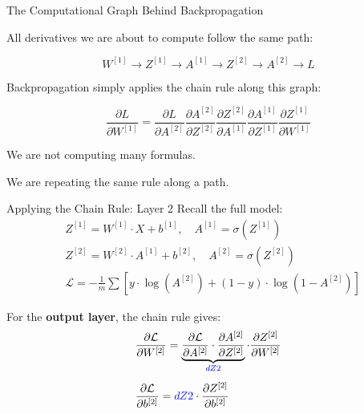 \documentclass[aspectratio=169]{beamer}
\begin{document}
\begin{frame}{The Computational Graph Behind Backpropagation}

All derivatives we are about to compute follow the same path:

\[
W^{[1]} \rightarrow Z^{[1]} \rightarrow A^{[1]} \rightarrow Z^{[2]} \rightarrow A^{[2]} \rightarrow L
\]

Backpropagation simply applies the chain rule along this graph:

\[
\frac{\partial L}{\partial W^{[1]}}
=
\frac{\partial L}{\partial A^{[2]}}
\frac{\partial A^{[2]}}{\partial Z^{[2]}}
\frac{\partial Z^{[2]}}{\partial A^{[1]}}
\frac{\partial A^{[1]}}{\partial Z^{[1]}}
\frac{\partial Z^{[1]}}{\partial W^{[1]}}
\]

We are not computing many formulas.

We are repeating the same rule along a path.
\end{frame}
%
%
%
%
\begin{frame}{Applying the Chain Rule: Layer 2}
Recall the full model:
\begin{align*}
&Z^{[1]} = W^{[1]} \cdot X + b^{[1]}, \quad A^{[1]} = \sigma(Z^{[1]})\\
&Z^{[2]} = W^{[2]} \cdot A^{[1]} + b^{[2]}, \quad A^{[2]} = \sigma(Z^{[2]})\\
&\mathcal{L} = -\frac{1}{m} \sum \left[ y \cdot \log(A^{[2]}) + (1 - y) \cdot \log(1 - A^{[2]}) \right]
\end{align*}

For the \textbf{output layer}, the chain rule gives:
\begin{align*}
&\frac{\partial \mathcal{L}}{\partial W^{[2]}} = \underbrace{\frac{\partial \mathcal{L}}{\partial A^{[2]}} \cdot \frac{\partial A^{[2]}}{\partial Z^{[2]}}}_{\textcolor{blue}{dZ2}} \cdot \frac{\partial Z^{[2]}}{\partial W^{[2]}}
\\[0.5em]
&\frac{\partial \mathcal{L}}{\partial b^{[2]}} = \textcolor{blue}{dZ2} \cdot \frac{\partial Z^{[2]}}{\partial b^{[2]}}
\end{align*}
\end{frame}
%
%
\end{document}
